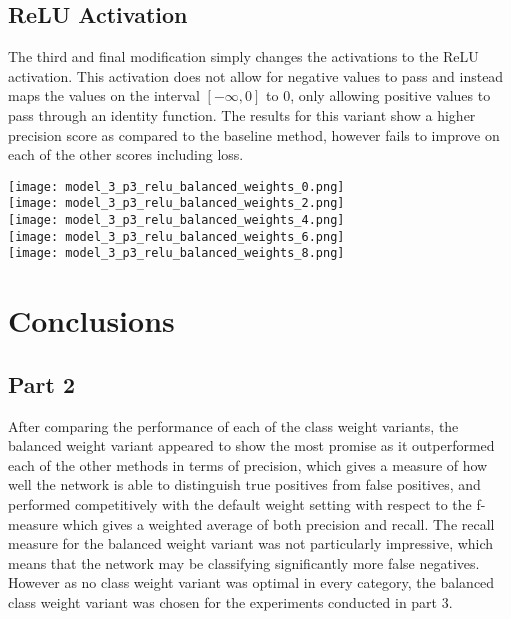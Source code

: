 \documentclass{article}
\begin{document}
\subsection*{ReLU Activation}
The third and final modification simply changes the activations to the ReLU activation. This activation does not allow for negative values to pass and instead maps the values on the interval $[-\infty,0]$ to 0, only allowing positive values to pass through an identity function. The results for this variant show a higher precision score as compared to the baseline method, however fails to improve on each of the other scores including loss. 
		
\texttt{[image: model\_3\_p3\_relu\_balanced\_weights\_0.png]} \\
\texttt{[image: model\_3\_p3\_relu\_balanced\_weights\_2.png]} \\
\texttt{[image: model\_3\_p3\_relu\_balanced\_weights\_4.png]} \\
\texttt{[image: model\_3\_p3\_relu\_balanced\_weights\_6.png]} \\
\texttt{[image: model\_3\_p3\_relu\_balanced\_weights\_8.png]} \\


\section*{Conclusions}
\subsection*{Part 2}
After comparing the performance of each of the class weight variants, the balanced weight variant appeared to show the most promise as it outperformed each of the other methods in terms of precision, which gives a measure of how well the network is able to distinguish true positives from false positives, and performed competitively with the default weight setting with respect to the f-measure which gives a weighted average of both precision and recall. The recall measure for the balanced weight variant was not particularly impressive, which means that the network may be classifying significantly more false negatives. However as no class weight variant was optimal in every category, the balanced class weight variant was chosen for the experiments conducted in part 3.
\end{document}
